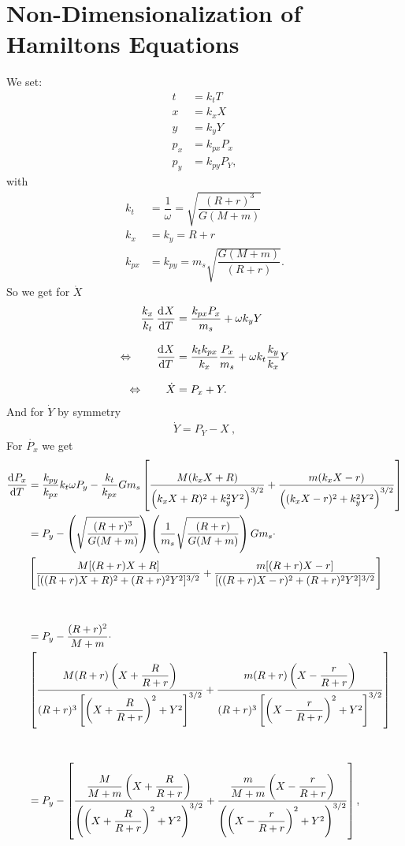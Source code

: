 \chapter{Non-Dimensionalization of Hamiltons Equations} \label{app:non-dimensionalization}
We set:
\begin{align}
t &= k_t T \\
x &= k_x X \\
y &= k_y Y \\
p_x &= k_{px} P_x \\
p_y &= k_{py} P_Y ,
\end{align}
with
\begin{align}
k_t &= \dfrac{1}{\omega} = \sqrt{\dfrac{(R+r)^3}{G(M+m)}} \\[0.5cm]
k_x &= k_y = R+r \\[0.5cm]
k_{px} &= k_{py} = m_s \sqrt{\dfrac{G(M+m)}{(R+r)}} .
\end{align}
So we get for $\dot{X}$
\begin{align}
\dfrac{k_x}{k_t} \dod{X}{T} &= \dfrac{k_{px} P_x}{m_s} + \omega k_y Y \\[0.3cm]
\Leftrightarrow \qquad \dod{X}{T} &= \dfrac{k_t k_{px}}{k_x} \dfrac{P_x}{m_s} + \omega k_t \dfrac{k_y}{k_x} Y \\[0.3cm]
\Leftrightarrow \qquad \dot{X} &= P_x + Y .
\end{align}
And for $\dot{Y}$ by symmetry
\begin{align}
\dot{Y} = P_Y - X \ ,
\end{align}
For $\dot{P_x}$ we get
\begin{align}
\dod{P_x}{T} &= \dfrac{k_{py}}{k_{px}} k_t\omega P_y - \dfrac{k_t}{k_{px}}G m_s \left[\dfrac{M(k_x X + R)}{\left(k_x X + R)^2 + k_y^2 Y^2\right)^{3/2}} + \dfrac{m (k_x X - r)}{\left((k_x X - r)^2 + k_y^2 Y^2\right)^{3/2}} \right] \\
&= P_y - \left(\sqrt{\dfrac{(R+r)^3}{G(M+m)}}\right) \left(\dfrac{1}{m_s} \sqrt{\dfrac{(R+r)}{G(M+m)}}\right) G m_s \cdot \\
\nonumber &\left[\dfrac{M[(R+r) X + R]}{[((R+r) X + R)^2 + (R+r)^2 Y^2]^{3/2}} + \dfrac{m[(R+r) X - r]}{[((R+r) X - r)^2 + (R+r)^2 Y^2]^{3/2}} \right] \\[1cm]
&= P_y - \dfrac{(R+r)^2}{M+m} \cdot \\ 
\nonumber &\left[\dfrac{M(R+r)\left(X + \dfrac{R}{R+r}\right)}{(R+r)^3\left[\left(X + \dfrac{R}{R+r}\right)^2 + Y^2\right]^{3/2}} + \dfrac{m (R+r)\left(X - \dfrac{r}{R+r}\right)}{(R+r)^3\left[\left(X - \dfrac{r}{R+r}\right)^2 + Y^2\right]^{3/2}} \right] \\[1cm]
&= P_y - \left[\dfrac{\dfrac{M}{M+m}\left(X + \dfrac{R}{R+r}\right)}{\left(\left(X + \dfrac{R}{R+r}\right)^2 + Y^2\right)^{3/2}} + \dfrac{\dfrac{m}{M+m} \left(X - \dfrac{r}{R+r}\right)}{\left(\left(X - \dfrac{r}{R+r}\right)^2 + Y^2\right)^{3/2}} \right] ,
\end{align}

